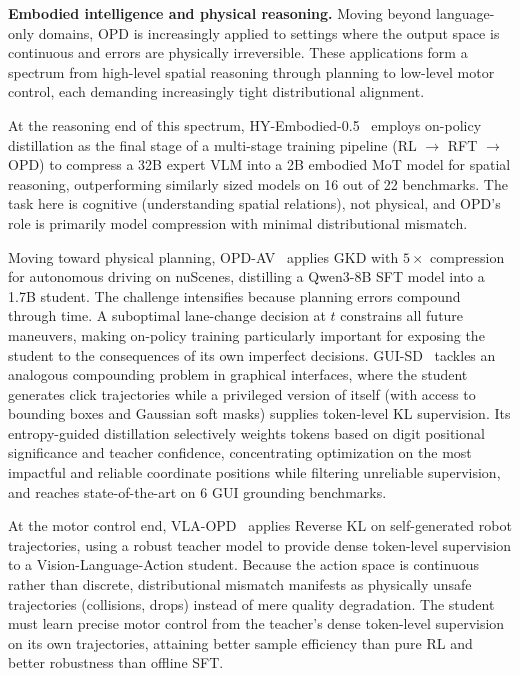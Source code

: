 \documentclass{article} %
\begin{document}
\textbf{Embodied intelligence and physical reasoning.} Moving beyond language-only domains, OPD is increasingly applied to settings where the output space is continuous and errors are physically irreversible. These applications form a spectrum from high-level spatial reasoning through planning to low-level motor control, each demanding increasingly tight distributional alignment.

At the reasoning end of this spectrum, HY-Embodied-0.5~\citep{tencent2026hyembodied} employs on-policy distillation as the final stage of a multi-stage training pipeline (RL $\to$ RFT $\to$ OPD) to compress a 32B expert VLM into a 2B embodied MoT model for spatial reasoning, outperforming similarly sized models on 16 out of 22 benchmarks. The task here is cognitive (understanding spatial relations), not physical, and OPD's role is primarily model compression with minimal distributional mismatch.

Moving toward physical planning, OPD-AV~\citep{afsharrad2026onpolicy} applies GKD with $5\times$ compression for autonomous driving on nuScenes, distilling a Qwen3-8B SFT model into a 1.7B student. The challenge intensifies because planning errors compound through time. A suboptimal lane-change decision at $t$ constrains all future maneuvers, making on-policy training particularly important for exposing the student to the consequences of its own imperfect decisions. GUI-SD~\citep{zhang2026guisd} tackles an analogous compounding problem in graphical interfaces, where the student generates click trajectories while a privileged version of itself (with access to bounding boxes and Gaussian soft masks) supplies token-level KL supervision. Its entropy-guided distillation selectively weights tokens based on digit positional significance and teacher confidence, concentrating optimization on the most impactful and reliable coordinate positions while filtering unreliable supervision, and reaches state-of-the-art on 6 GUI grounding benchmarks.

At the motor control end, VLA-OPD~\citep{zhong2026vlaopd} applies Reverse KL on self-generated robot trajectories, using a robust teacher model to provide dense token-level supervision to a Vision-Language-Action student. Because the action space is continuous rather than discrete, distributional mismatch manifests as physically unsafe trajectories (collisions, drops) instead of mere quality degradation. The student must learn precise motor control from the teacher's dense token-level supervision on its own trajectories, attaining better sample efficiency than pure RL and better robustness than offline SFT.
\end{document}
